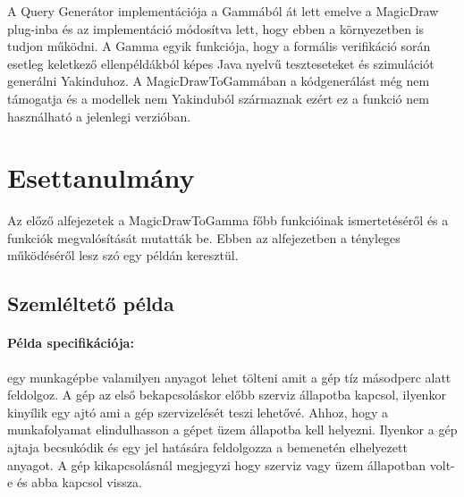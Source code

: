 A Query Generátor implementációja a Gammából át lett emelve a MagicDraw plug-inba és az implementáció módosítva lett, hogy ebben a környezetben is tudjon működni. A Gamma egyik funkciója, hogy a formális verifikáció során esetleg keletkező ellenpéldákból képes Java nyelvű teszteseteket és szimulációt generálni Yakinduhoz. A MagicDrawToGammában a kódgenerálást még nem támogatja és a modellek nem Yakinduból származnak ezért ez a funkció nem használható a jelenlegi verzióban.

\section{Esettanulmány}

Az előző alfejezetek a MagicDrawToGamma főbb funkcióinak ismertetéséről és a funkciók megvalósítását mutatták be. Ebben az alfejezetben a  tényleges működéséről lesz szó egy példán keresztül.

\subsection{Szemléltető példa}

\paragraph{Példa specifikációja:} egy munkagépbe valamilyen anyagot lehet tölteni amit a gép tíz másodperc alatt feldolgoz. A gép az első bekapcsoláskor előbb szerviz állapotba kapcsol, ilyenkor kinyílik egy ajtó ami a gép szervizelését teszi lehetővé. Ahhoz, hogy a munkafolyamat elindulhasson a gépet üzem állapotba kell helyezni. Ilyenkor a gép ajtaja becsukódik és egy jel hatására feldolgozza a bemenetén elhelyezett anyagot. A gép kikapcsolásnál megjegyzi hogy szerviz vagy üzem állapotban volt-e és abba kapcsol vissza.

